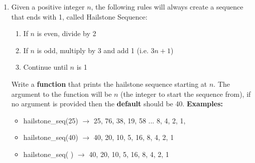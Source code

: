 \documentclass{article}
\begin{document}
\begin{enumerate}
	\item 
		Given a positive integer $n$, the following rules will always create a sequence that 
		ends with 1, called Hailstone Sequence:
		\begin{enumerate}
			\item If $n$ is even, divide by 2
			\item If $n$ is odd, multiply by 3 and add 1 (i.e. $3n+1$)
			\item Continue until $n$ is 1
		\end{enumerate}
		Write a \textbf{function} that prints the hailstone sequence starting at $n$. 
		The argument to the function will be $n$ (the integer to start the sequence from), 
		if no argument is provided then the \textbf{default} should be 40.
		\textbf{Examples:}		
		\begin{itemize}
			\item  hailstone\_seq(25) $\rightarrow$ 25, 76, 38, 19, 58 ... 8, 4, 2, 1, 
			\item  hailstone\_seq(40) $\rightarrow$ 40, 20, 10, 5, 16, 8, 4, 2, 1
			\item  hailstone\_seq( ) $\rightarrow$ 40, 20, 10, 5, 16, 8, 4, 2, 1
		\end{itemize}


\end{enumerate}
\pagebreak
\end{document}
